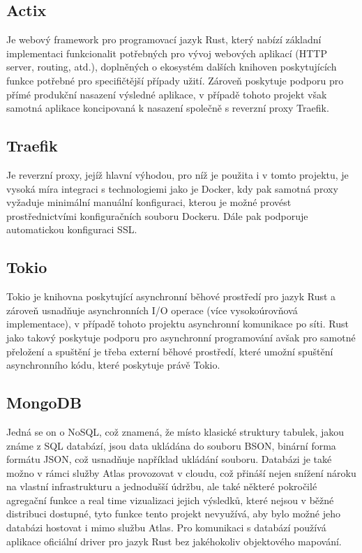 \documentclass[12pt]{article}
\begin{document}
\subsection{Actix}
Je webový framework pro programovací jazyk Rust, který nabízí základní implementaci funkcionalit potřebných pro vývoj webových aplikací (HTTP server, routing, atd.), doplněných o ekosystém dalších knihoven poskytujících funkce potřebné pro specifičtější případy užití. Zároveň poskytuje podporu pro přímé produkční nasazení výsledné aplikace, v případě tohoto projekt však samotná aplikace koncipovaná k nasazení společně s reverzní proxy Traefik\cite{actix}.
\subsection{Traefik}
Je reverzní proxy, jejíž hlavní výhodou, pro níž je použita i v tomto projektu, je vysoká míra integraci s technologiemi jako je Docker, kdy pak samotná proxy vyžaduje minimální manuální konfiguraci, kterou je možné provést prostřednictvími konfiguračních souboru Dockeru. Dále pak podporuje automatickou konfiguraci SSL\cite{autossl}\cite{traefik}.
\subsection{Tokio}
Tokio je knihovna poskytující asynchronní běhové prostředí pro jazyk Rust a zároveň usnadňuje asynchronních I/O operace (více vysokoúrovňová implementace), v případě tohoto projektu asynchronní komunikace po síti. Rust jako takový poskytuje podporu pro asynchronní programování avšak pro samotné přeložení a spuštění je třeba externí běhové prostředí, které umožní spuštění asynchronního kódu, které poskytuje právě Tokio\cite{tokio}.
\subsection{MongoDB}
Jedná se on o NoSQL, což znamená, že místo klasické struktury tabulek, jakou známe z SQL databází, jsou data ukládána do souboru BSON, binární forma formátu JSON, což usnadňuje například ukládání souboru. Databázi je také možno v rámci služby Atlas provozovat v cloudu, což přináší nejen snížení nároku na vlastní infrastrukturu a jednodušší údržbu, ale také některé pokročilé agregační funkce a real time vizualizaci jejich výsledků, které nejsou v běžné distribuci dostupné, tyto funkce tento projekt nevyužívá, aby bylo možné jeho databázi hostovat i mimo službu Atlas. Pro komunikaci s databází používá aplikace oficiální driver pro jazyk Rust bez jakéhokoliv objektového mapování.
\end{document}
